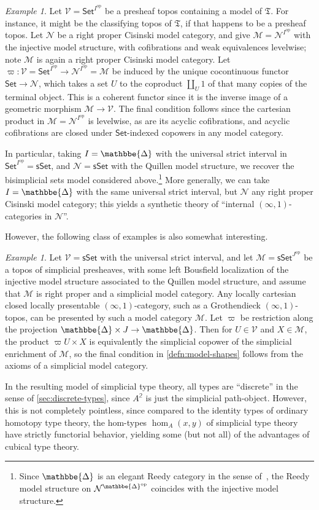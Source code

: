\documentclass{amsart}
\theoremstyle{plain}
\theoremstyle{definition}
\theoremstyle{remark}
\newtheorem{ex}[thm]{Example}
\numberwithin{equation}{section}
\newcommand{\two}{\mathbb{2}}
\newcommand{\Set}{\mathsf{Set}}
\newcommand{\sSet}{\mathsf{sSet}}
\newcommand{\DDelta}{\mathbbe{\Delta}}
\newcommand{\op}{\mathrm{op}}
\newcommand{\M}{\mathcal{M}}
\newcommand{\N}{\mathcal{N}}
\newcommand{\V}{\mathcal{V}}
\newcommand{\fT}{\mathfrak{T}}
\begin{document}
\begin{ex}\label{thm:model-shapes}
  Let $\V = \Set^{I^\op}$ be a presheaf topos containing a model of $\fT$.
  For instance, it might be the classifying topos of $\fT$, if that happens to be a presheaf topos.
  Let $\N$ be a right proper Cisinski model category, and give $\M = \N^{I^\op}$ with the injective model structure, with cofibrations and weak equivalences levelwise; note $\M$ is again a right proper Cisinski model category.
 Let $\varpi : \V = \Set^{I^\op} \to \N^{I^\op}= \M$ be induced by the unique cocontinuous functor $\Set\to\N$, which takes a set $U$ to the coproduct $\coprod_U 1$ of that many copies of the terminal object.
    This is a coherent functor since it is the inverse image of a geometric morphism $\M\to\V$.
    The final condition follows since the cartesian product in $\M = \N^{I^\op}$ is levelwise, as are its acyclic cofibrations, and acyclic cofibrations are closed under $\Set$-indexed copowers in any model category.

  In particular, taking $I= \DDelta$ with the universal strict interval in $\Set^{I^\op} = \sSet$, and $\N = \sSet$ with the Quillen model structure, we recover the bisimplicial sets model considered above.\footnote{Since $\DDelta$ is an elegant Reedy category in the sense of~\cite{BR}, the Reedy model structure on $\N^{\DDelta^\op}$ coincides with the injective model structure.}
  More generally, we can take $I= \DDelta$ with the same universal strict interval, but $\N$ any right proper Cisinski model category; this yields a synthetic theory of ``internal $(\infty,1)$-categories in $\N$''.
\end{ex}

However, the following class of examples is also somewhat interesting.

\begin{ex}\label{thm:model-discrete}
  Let $\V = \sSet$ with the universal strict interval, and let $\M = \sSet^{J^\op}$ be a topos of simplicial presheaves, with some left Bousfield localization of the injective model structure associated to the Quillen model structure, and assume that $\M$ is right proper and a simplicial model category.
  Any locally cartesian closed locally presentable $(\infty,1)$-category, such as a Grothendieck $(\infty,1)$-topos, can be presented by such a model category $\M$.
 Let $\varpi$ be restriction along the projection $\DDelta \times J \to \DDelta$.
  Then for $U\in\V$ and $X\in \M$, the product ${\varpi U}\times X$ is equivalently the simplicial copower of the simplicial enrichment of $\M$, so the final condition in \cref{defn:model-shapes} follows from the axioms of a simplicial model category.

  In the resulting model of simplicial type theory, all types are ``discrete'' in the sense of \cref{sec:discrete-types}, since $A^\two$ is just the simplicial path-object.
  However, this is not completely pointless, since compared to the identity types of ordinary homotopy type theory, the hom-types $\hom_A(x,y)$ of simplicial type theory have strictly functorial behavior, yielding some (but not all) of the advantages of cubical type theory.
\end{ex}
\end{document}
